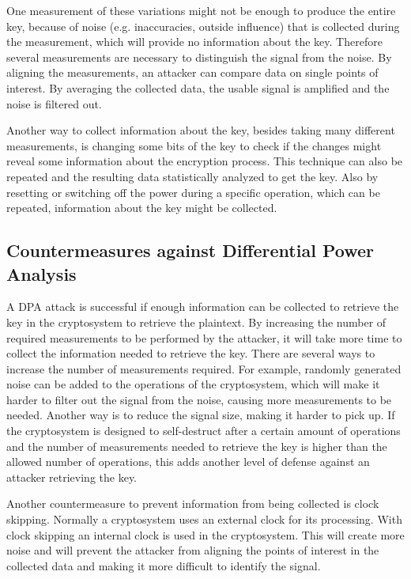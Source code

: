One measurement of these variations might not be enough to produce the entire key, because of noise (e.g. inaccuracies, outside influence) that is collected during the measurement, which will provide no information about the key.
Therefore several measurements are necessary to distinguish the signal from the noise.
By aligning the measurements, an attacker can compare data on single points of interest.
By averaging the collected data, the usable signal is amplified and the noise is filtered out.

Another way to collect information about the key, besides taking many different measurements, is changing some bits of the key to check if the changes might reveal some information about the encryption process.
This technique can also be repeated and the resulting data statistically analyzed to get the key.
Also by resetting or switching off the power during a specific operation, which can be repeated, information about the key might be collected. \cite{kocher2009differential}

\subsection{Countermeasures against Differential Power Analysis}
A DPA attack is successful if enough information can be collected to retrieve the key in the cryptosystem to retrieve the plaintext.
By increasing the number of required measurements to be performed by the attacker, it will take more time to collect the information needed to retrieve the key. 
There are several ways to increase the number of measurements required.
For example, randomly generated noise can be added to the operations of the cryptosystem, which will make it harder to filter out the signal from the noise, causing more measurements to be needed.
Another way is to reduce the signal size, making it harder to pick up. 
If the cryptosystem is designed to self-destruct after a certain amount of operations and the number of measurements needed to retrieve the key is higher than the allowed number of operations, this adds another level of defense against an attacker retrieving the key.

Another countermeasure to prevent information from being collected is clock skipping.
Normally a cryptosystem uses an external clock for its processing.
With clock skipping an internal clock is used in the cryptosystem.
This will create more noise and will prevent the attacker from aligning the points of interest in the collected data and making it more difficult to identify the signal. 


